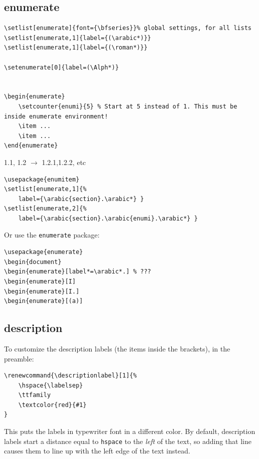 \documentclass{article}
\renewcommand{\descriptionlabel}[1]{%
    \ttfamily\textcolor{cadet}{#1}
}
\begin{document}
\subsection{enumerate}
\begin{lstlisting}
\setlist[enumerate]{font={\bfseries}}% global settings, for all lists
\setlist[enumerate,1]{label={(\arabic*)}}
\setlist[enumerate,1]{label={(\roman*)}}

\setenumerate[0]{label=(\Alph*)}


\begin{enumerate}
    \setcounter{enumi}{5} % Start at 5 instead of 1. This must be inside enumerate environment!
    \item ...
    \item ...
\end{enumerate}
\end{lstlisting}

1.1, 1.2 $\rightarrow$ 1.2.1,1.2.2, etc
\begin{lstlisting}
\usepackage{enumitem}
\setlist[enumerate,1]{%
    label={\arabic{section}.\arabic*} }
\setlist[enumerate,2]{%
    label={\arabic{section}.\arabic{enumi}.\arabic*} }
\end{lstlisting}
Or use the \texttt{enumerate} package:
\begin{lstlisting}
\usepackage{enumerate}
\begin{document}
\begin{enumerate}[label*=\arabic*.] % ???
\begin{enumerate}[I]
\begin{enumerate}[I.]
\begin{enumerate}[(a)]
\end{lstlisting}

\subsection{description}
To customize the description labels (the items inside the brackets), in the preamble:
\begin{lstlisting}
\renewcommand{\descriptionlabel}[1]{%
    \hspace{\labelsep}
    \ttfamily
    \textcolor{red}{#1}
}
\end{lstlisting}
This puts the labels in typewriter font in a different color.
By default, description labels start a distance equal to
\texttt{hspace} to the \emph{left} of the text, so adding that line
causes them to line up with the left edge of the text instead.
\end{document}
